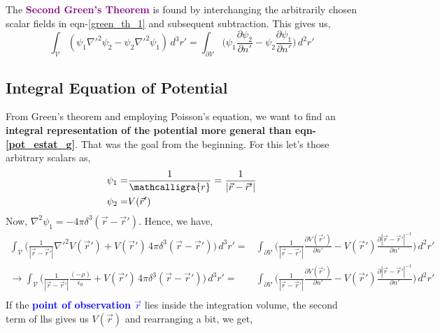 \documentclass{article}
\newcommand{\scriptr}{\mathord{\mathcalligra{r}}}
\begin{document}
The \textcolor{purple}{\textbf{Second Green's Theorem}} is found by interchanging the arbitrarily chosen scalar fields in eqn-\ref{green_th_1} and subsequent subtraction. This gives us,
\begin{equation}
    \int_{\mathcal{V}} (\psi_1 \nabla'^2 \psi_2 - \psi_2 \nabla'^2 \psi_1)\, d^3 r' = \int_{\partial \mathcal{V}}\Bigg(\psi_1 \frac{\partial \psi_2}{\partial n'} - \psi_2 \frac{\partial \psi_1}{\partial n'}\Bigg)\, d^2 r'
    \label{green_th_2}
\end{equation}
\subsection{Integral Equation of Potential}
From Green's theorem and employing Poisson's equation, we want to find an \textbf{integral representation of the potential more general than eqn-\ref{pot_estat_g}}. That was the goal from the beginning. For this let's those arbitrary scalars as,
\begin{equation}
    \begin{split}
        \psi_1 = & \frac{1}{\scriptr} = \frac{1}{|\vec{r}-\vec{r}'|}\\
        \psi_2 = & V(\vec{r}')
    \end{split}
\end{equation}
Now, $\nabla^2 \psi_1 = -4\pi \delta^3(\vec{r}-\vec{r}')$. Hence, we have,
\begin{equation}
    \begin{split}
        \int_{\mathcal{V}} \Bigg(\frac{1}{|\vec{r}-\vec{r}'|} \nabla'^2 V(\vec{r}') + V(\vec{r}') \, 4\pi \delta^3(\vec{r}-\vec{r}')\Bigg)\, d^3 r' = & \int_{\partial \mathcal{V}}\Bigg(\frac{1}{|\vec{r}-\vec{r}'|} \frac{\partial V(\vec{r}')}{\partial n'} - V(\vec{r}') \frac{\partial |\vec{r}-\vec{r}'|^{-1}}{\partial n'}\Bigg)\, d^2 r'\\
        \to \int_{\mathcal{V}} \Bigg(\frac{1}{|\vec{r}-\vec{r}'|} \frac{(-\rho)}{\epsilon_0} + V(\vec{r}') \, 4\pi \delta^3(\vec{r}-\vec{r}')\Bigg)\, d^3 r' = & \int_{\partial \mathcal{V}}\Bigg(\frac{1}{|\vec{r}-\vec{r}'|} \frac{\partial V(\vec{r}')}{\partial n'} - V(\vec{r}') \frac{\partial |\vec{r}-\vec{r}'|^{-1}}{\partial n'}\Bigg)\, d^2 r'\\
    \end{split}
\end{equation}
If the \textcolor{blue}{\textbf{point of observation $\vec{r}$}} lies inside the integration volume, the second term of \gls{lhs} gives us $V(\vec{r})$ and rearranging a bit, we get,
\end{document}

